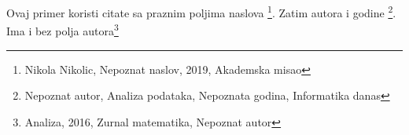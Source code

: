 \documentclass{article}
\begin{document}
Ovaj primer koristi citate sa praznim poljima naslova \footnote{Nikola Nikolic, Nepoznat naslov, 2019, Akademska misao}. Zatim autora i godine \footnote{Nepoznat autor, Analiza podataka, Nepoznata godina, Informatika danas}.
Ima i bez polja autora\footnote{Analiza, 2016, Zurnal matematika, Nepoznat autor}
\end{document}
